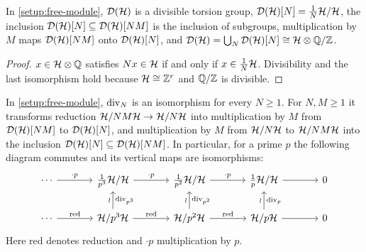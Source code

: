 \begin{lemma}\label{lem:divisible-torsion}
In \cref{setup:free-module}, $\mathcal{D}(\mathcal{H})$ is a divisible
torsion group,
$\mathcal{D}(\mathcal{H})[N] = \tfrac{1}{N}\mathcal{H}/\mathcal{H}$, the
inclusion $\mathcal{D}(\mathcal{H})[N] \subseteq \mathcal{D}(\mathcal{H})[NM]$
is the inclusion of subgroups, multiplication by $M$ maps
$\mathcal{D}(\mathcal{H})[NM]$ onto $\mathcal{D}(\mathcal{H})[N]$, and
$\mathcal{D}(\mathcal{H}) = \bigcup_N \mathcal{D}(\mathcal{H})[N]
\cong \mathcal{H}\otimes\mathbb{Q}/\mathbb{Z}$.
\end{lemma}

\begin{proof}
$x \in \mathcal{H}\otimes\mathbb{Q}$ satisfies $Nx \in \mathcal{H}$ if and only if
$x \in \tfrac{1}{N}\mathcal{H}$. Divisibility and the last isomorphism hold
because $\mathcal{H} \cong \mathbb{Z}^{r}$ and $\mathbb{Q}/\mathbb{Z}$ is divisible.
\end{proof}

\begin{lemma}[Division by $N$]\label{lem:division-by-N}
In \cref{setup:free-module}, $\mathrm{div}_{N}$ is an isomorphism for every
$N \geq 1$. For $N, M \geq 1$ it transforms reduction
$\mathcal{H}/NM\mathcal{H} \to \mathcal{H}/N\mathcal{H}$ into
multiplication by $M$ from $\mathcal{D}(\mathcal{H})[NM]$ to
$\mathcal{D}(\mathcal{H})[N]$, and multiplication by $M$ from
$\mathcal{H}/N\mathcal{H}$ to $\mathcal{H}/NM\mathcal{H}$ into the inclusion
$\mathcal{D}(\mathcal{H})[N] \subseteq \mathcal{D}(\mathcal{H})[NM]$. In
particular, for a prime $p$ the following diagram commutes and its
vertical maps are isomorphisms:
\[
\begin{tikzcd}[column sep=large]
  \cdots \arrow[r, "\cdot p"] &
  \tfrac{1}{p^{3}}\FreeModule/\FreeModule \arrow[r, "\cdot p"] &
  \tfrac{1}{p^{2}}\FreeModule/\FreeModule \arrow[r, "\cdot p"] &
  \tfrac{1}{p}\FreeModule/\FreeModule \arrow[r] & 0 \\
  \cdots \arrow[r, "\mathrm{red}"] &
  \FreeModule/p^{3}\FreeModule \arrow[r, "\mathrm{red}"]
    \arrow[u, "\DivisionMap{p^{3}}"', "\wr"] &
  \FreeModule/p^{2}\FreeModule \arrow[r, "\mathrm{red}"]
    \arrow[u, "\DivisionMap{p^{2}}"', "\wr"] &
  \FreeModule/p\FreeModule \arrow[r]
    \arrow[u, "\DivisionMap{p}"', "\wr"] & 0
\end{tikzcd}
\]
Here $\mathrm{red}$ denotes reduction and $\cdot p$ multiplication by $p$.
\end{lemma}

